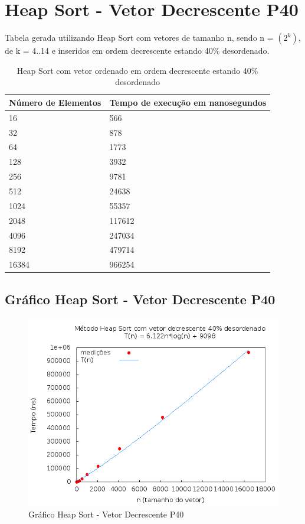 \documentclass[12pt,a4paper,twoside]{report}
\begin{document}
\section{Heap Sort - Vetor Decrescente P40}
Tabela gerada utilizando Heap Sort com vetores de tamanho n, sendo n = $(2^k)$, de k = 4..14 e inseridos em ordem decrescente estando 40\% desordenado.
\begin{table}[H]
\centering
\caption{Heap Sort com vetor ordenado em ordem decrescente estando 40\% desordenado}
\label{my-label}
\begin{tabular}{|l|l|}
\hline
\multicolumn{1}{|c|}{\textbf{Número de Elementos}} & \multicolumn{1}{c|}{\textbf{Tempo de execução em nanosegundos}} \\ \hline
16 & 566 \\ \hline
32 & 878 \\ \hline
64 & 1773 \\ \hline
128 & 3932 \\ \hline
256 & 9781 \\ \hline
512 & 24638 \\ \hline
1024 & 55357 \\ \hline
2048 & 117612 \\ \hline
4096 & 247034 \\ \hline
8192 & 479714 \\ \hline
16384 & 966254 \\ \hline
\end{tabular}
\end{table}

\subsection{Gráfico Heap Sort - Vetor Decrescente P40}
\begin{figure}[H]
    \centering
    \includegraphics[width=0.7\linewidth]{graficos/HeapSort/vIntDecrescenteP40/vIntDecrescenteP40.png}
  \caption{Gráfico Heap Sort - Vetor Decrescente P40}
\end{figure}
\end{document}
